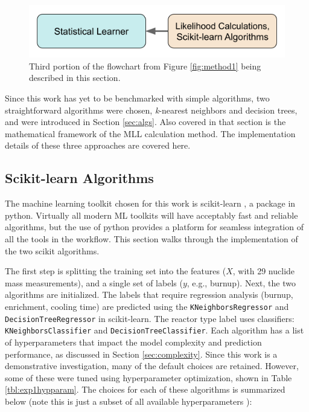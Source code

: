 
\begin{figure}[H]
  \centering
  \includegraphics[width=0.7\linewidth]{./chapters/exp1/methodology1_3.png}
  \caption{Third portion of the flowchart from Figure \ref{fig:method1} being 
           described in this section.}
\end{figure}

Since this work has yet to be benchmarked with simple algorithms, two
straightforward algorithms were chosen, \textit{k}-nearest neighbors and
decision trees, and were introduced in Section \ref{sec:algs}. Also covered in
that section is the mathematical framework of the \gls{MLL} calculation method.
The implementation details of these three approaches are covered here. 

\subsection{Scikit-learn Algorithms}

The machine learning toolkit chosen for this work is scikit-learn
\cite{scikit}, a package in python.  Virtually all modern \gls{ML} toolkits
will have acceptably fast and reliable algorithms, but the use of python
provides a platform for seamless integration of all the tools in the workflow.
This section walks through the implementation of the two scikit algorithms. 


The first step is splitting the training set into the features ($X$, with 29
nuclide mass measurements), and a single set of labels ($y$, e.g., burnup).
Next, the two algorithms are initialized.  The labels that require regression
analysis (burnup, enrichment, cooling time) are predicted using the
\texttt{KNeighborsRegressor} and \texttt{DecisionTreeRegressor} in
scikit-learn. The reactor type label uses classifiers:
\texttt{KNeighborsClassifier} and \texttt{DecisionTreeClassifier}.  Each
algorithm has a list of hyperparameters that impact the model complexity and
prediction performance, as discussed in Section \ref{sec:complexity}. Since
this work is a demonstrative investigation, many of the default choices are
retained. However, some of these were tuned using hyperparameter optimization,
shown in Table \ref{tbl:exp1hypparam}.  The choices for each of these
algorithms is summarized below (note this is just a subset of all available
hyperparameters \cite{scikit}):

